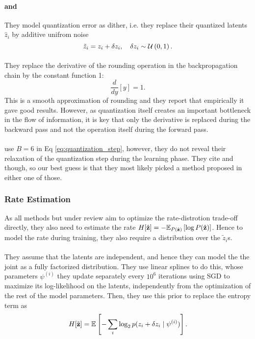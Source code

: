 \paragraph{\cite{balle2016end} and \cite{balle2018variational}}
They model quantization
error as dither, i.e. they replace their quantized latents
$\hat{z}_i$ by additive unifrom noise
\[
  \tilde{z}_i = z_i + \delta z_i, \quad \delta z_i \sim \mathcal{U}\left( 0, 1 \right). 
\]

\paragraph{\cite{theis2017lossy}} They replace the derivative of the rounding
operation in the backpropagation chain by the constant function 1:
\[
  \frac{d}{d y} [y] = 1.
\]
This is a smooth approximation of rounding and they report that empirically it
gave good results. However, as quantization itself creates an important
bottleneck in the flow of information, it is key that only the derivative is
replaced during the backward pass and not the operation itself during the
forward pass.

\paragraph{\cite{rippel2017real}} use $B = 6$ in Eq \ref{eq:quantization_step},
however, they do not reveal their relaxation of the quantization step during
the learning phase. They cite \cite{balle2016end} and \cite{toderici2017full}
though, so our best guess is that they most likely picked a method proposed in
either one of those.

\subsubsection{Rate Estimation}
\par
As all methods but \cite{rippel2017real} under review aim to optimize
the rate-distrotion trade-off
directly, they also need to estimate the rate $H[\hat{\mathbf{z}}] = -\mathbb{E}_{P(\hat{\mathbf{z}})}\left[ \log
  P(\hat{\mathbf{z}}) \right]$. Hence to model the rate during training,
they also require a distribution over the $\tilde{z}_i$s.

\paragraph{\cite{balle2016end}}
  They assume that the latents are independent, and hence they
  can model the the joint as a fully factorized distribution. They use linear
  splines to do this, whose parameters $\psi^{(i)}$ they update separately every
  $10^6$ iterations using SGD to maximize its log-likelihood on the latents,
  independently from the optimization of the rest of the model parameters.
  Then, they use this prior to replace the entropy term as
  \[
   H[\tilde{\mathbf{z}}] = \mathbb{E}_{}\left[ -\sum_i \log_2 p(z_i + \delta z_i \mid \psi^{(i)}) \right].
  \]

